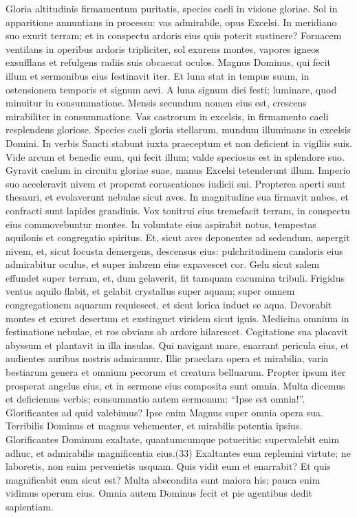 \begin{biblechapter}  
\verse Gloria altitudinis firmamentum puritatis, species caeli in visione gloriae. 
\verse Sol in apparitione annuntians in processu: vas admirabile, opus Excelsi. 
\verse In meridiano suo exurit terram; et in conspectu ardoris eius quis poterit sustinere? Fornacem ventilans in operibus ardoris tripliciter, 
\verse sol exurens montes, vapores igneos exsufflans et refulgens radiis suis obcaecat oculos. 
\verse Magnus Dominus, qui fecit illum et sermonibus eius festinavit iter. 
\verse Et luna stat in tempus suum, in ostensionem temporis et signum aevi. 
\verse A luna signum diei festi; luminare, quod minuitur in consummatione. 
\verse Mensis secundum nomen eius est, crescens mirabiliter in consummatione. 
\verse Vas castrorum in excelsis, in firmamento caeli resplendens gloriose. 
\verse Species caeli gloria stellarum, mundum illuminans in excelsis Domini. 
\verse In verbis Sancti stabunt iuxta praeceptum et non deficient in vigiliis suis. 
\verse Vide arcum et benedic eum, qui fecit illum; valde speciosus est in splendore suo. 
\verse Gyravit caelum in circuitu gloriae suae, manus Excelsi tetenderunt illum. 
\verse Imperio suo acceleravit nivem et properat coruscationes iudicii sui. 
\verse Propterea aperti sunt thesauri, et evolaverunt nebulae sicut aves. 
\verse In magnitudine sua firmavit nubes, et confracti sunt lapides grandinis. Vox tonitrui eius tremefacit terram, 
\verse in conspectu eius commovebuntur montes. In voluntate eius aspirabit notus, 
\verse tempestas aquilonis et congregatio spiritus. 
\verse Et, sicut aves deponentes ad sedendum, aspergit nivem, et, sicut locusta demergens, descensus eius: 
\verse pulchritudinem candoris eius admirabitur oculus, et super imbrem eius expavescet cor. 
\verse Gelu sicut salem effundet super terram, et, dum gelaverit, fit tamquam cacumina tribuli. 
\verse Frigidus ventus aquilo flabit, et gelabit crystallus super aquam; super omnem congregationem aquarum requiescet, et sicut lorica induet se aqua. 
\verse Devorabit montes et exuret desertum et exstinguet viridem sicut ignis. 
\verse Medicina omnium in festinatione nebulae, et ros obvians ab ardore hilarescet. 
\verse Cogitatione sua placavit abyssum et plantavit in illa insulas. 
\verse Qui navigant mare, enarrant pericula eius, et audientes auribus nostris admiramur. 
\verse Illic praeclara opera et mirabilia, varia bestiarum genera et omnium pecorum et creatura belluarum. 
\verse Propter ipsum iter prosperat angelus eius, et in sermone eius composita sunt omnia. 
\verse Multa dicemus et deficiemus verbis; consummatio autem sermonum: “Ipse est omnia!”. 
\verse Glorificantes ad quid valebimus? Ipse enim Magnus super omnia opera sua. 
\verse Terribilis Dominus et magnus vehementer, et mirabilis potentia ipsius. 
\verse Glorificantes Dominum exaltate, quantumcumque potueritis: supervalebit enim adhuc, et admirabilis magnificentia eius.(33) 
\verse Exaltantes eum replemini virtute; ne laboretis, non enim pervenietis usquam. 
\verse Quis vidit eum et enarrabit? Et quis magnificabit eum sicut est? 
\verse Multa abscondita sunt maiora his; pauca enim vidimus operum eius. 
\verse Omnia autem Dominus fecit et pie agentibus dedit sapientiam. 
\end{biblechapter}


